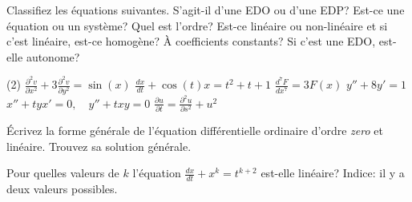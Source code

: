 \setcounter{exercise}{100}

\begin{exercise}
	Classifiez les équations suivantes. S'agit-il d'une EDO ou d'une EDP?
	Est-ce une équation ou un système?  Quel est l'ordre?
	Est-ce linéaire ou non-linéaire et si c'est linéaire, est-ce homogène?
	À coefficients constants?
	Si c'est une EDO, est-elle autonome?
	\begin{tasks}(2)
	\task $\displaystyle \frac{\partial^2 v}{\partial x^2} + 3 \frac{\partial^2 v}{\partial y^2} = \sin(x)$
	\task $\displaystyle \frac{d x}{dt} + \cos(t) x = t^2+t+1$
	\task $\displaystyle \frac{d^7 F}{dx^7} = 3F(x)$
	\task $\displaystyle y''+8y'=1$
	\task $\displaystyle x''+tyx'=0, \quad y''+txy = 0$
	\task $\displaystyle \frac{\partial u}{\partial t} = \frac{\partial^2 u}{\partial s^2} + u^2$
	\end{tasks}
\end{exercise}

\begin{exercise}
	Écrivez la forme générale de l'équation différentielle ordinaire d'ordre \emph{zero} et linéaire.
	Trouvez sa solution générale.
\end{exercise}

\begin{exercise}
	Pour quelles valeurs de $k$ l'équation $\frac{dx}{dt}+x^k = t^{k+2}$ est-elle linéaire?
	Indice: il y a deux valeurs possibles.
\end{exercise}
